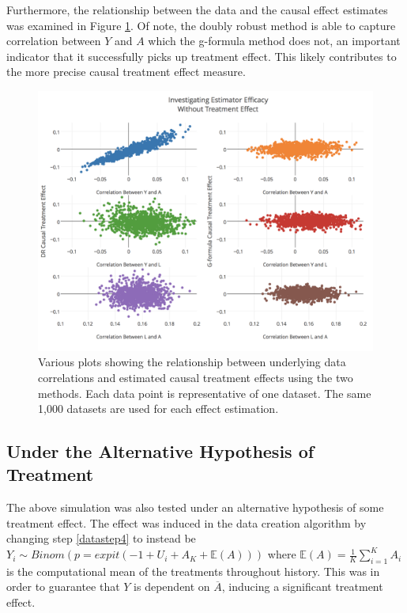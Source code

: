 Furthermore, the relationship between the data and the causal effect estimates was examined in Figure \ref{correlation}.  Of note, the doubly robust method is able to capture correlation between $Y$ and $A$ which the g-formula method does not, an important indicator that it successfully picks up treatment effect.  This likely contributes to the more precise causal treatment effect measure.  



\begin{figure}[h!]
\includegraphics[width = \linewidth]{figures/correlation.png}
\caption{Various plots showing the relationship between underlying data correlations and estimated causal treatment effects using the two methods.  Each data point is representative of one dataset.  The same 1,000 datasets are used for each effect estimation.}
\label{correlation}
\end{figure}

\subsection{Under the Alternative Hypothesis of Treatment} 
The above simulation was also tested under an alternative hypothesis of some treatment effect.  The effect was induced in the data creation algorithm by changing step \ref{datastep4} to instead be $Y_i \sim Binom(p = expit(-1+U_i + A_K + \mathbb{E}(A)))$ where $\mathbb{E}(A) = \frac{1}{K} \sum_{i=1}^K A_i $ is the computational mean of the treatments throughout history.  This was in order to guarantee that $Y$ is dependent on $\overline{A}$, inducing a significant treatment effect.  

